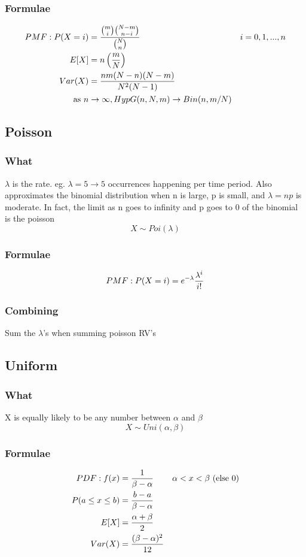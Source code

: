 \documentclass[12pt]{amsart}
\begin{document}
\subsubsection{Formulae}
\begin{align*}
PMF: P(X = i) &= { {m \choose i} {N-m \choose n-i} \over {N \choose n}} &i=0,1,...,n \\
E[X] &= n \left( {m \over N} \right) \\
Var(X) &= {nm(N-n)(N-m) \over N^2 (N-1)} \\
\text{as } n &\to \infty, HypG(n, N, m) \to Bin(n, m/N)
\end{align*}
%
\subsection{Poisson}
\subsubsection{What}
$\lambda$ is the rate. eg. $\lambda = 5 \to 5$ occurrences happening per time period. Also approximates the binomial distribution when n is large, p is small, and $\lambda = np$ is moderate. In fact, the limit as n goes to infinity and p goes to 0 of the binomial is the poisson
\[
X \sim Poi(\lambda)
\]
\subsubsection{Formulae}
\begin{align*}
PMF: P(X=i) = e^{-\lambda} {\lambda^i \over i!}
\end{align*}
\subsubsection{Combining}
Sum the $\lambda$'s when summing poisson RV's
%
\subsection{Uniform}
\subsubsection{What}
X is equally likely to be any number between $\alpha$ and $\beta$
\[
X \sim Uni(\alpha, \beta)
\]
\subsubsection{Formulae}
\begin{align*}
PDF: f(x) &= {1 \over \beta - \alpha} & \alpha < x < \beta \text{ (else 0)} \\
P(a \leq x \leq b) &= {b - a \over \beta - \alpha} \\
E[X] &= {\alpha + \beta \over 2} \\
Var(X) &= {(\beta - \alpha)^2 \over 12}
\end{align*}
%
\end{document}
